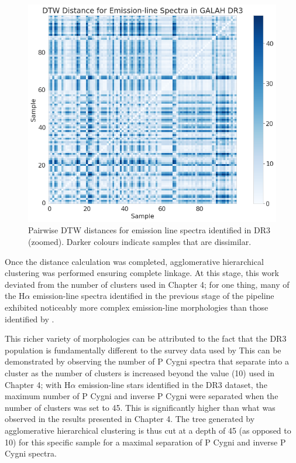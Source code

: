 \begin{figure}[!htb]
\centering
\includegraphics[scale=0.50]{figures/dtw distances dr3 zoomed.png}
\caption{Pairwise DTW distances for emission line spectra identified in DR3 (zoomed). Darker colours indicate samples that are dissimilar.}
\end{figure}

Once the distance calculation was completed, agglomerative hierarchical clustering was performed ensuring complete linkage. At this stage, this work deviated from the number of clusters used in Chapter 4; for one thing, many of the H$\alpha$ emission-line spectra identified in the previous stage of the pipeline exhibited noticeably more complex emission-line morphologies than those identified by \citet{vcotar2021galah}. 

This richer variety of morphologies can be attributed to the fact that the DR3 population is fundamentally different to the survey data used by \citet{vcotar2021galah} This can be demonstrated by observing the number of P Cygni spectra that separate into a cluster as the number of clusters is increased beyond the value (10) used in Chapter 4; with H$\alpha$ emission-line stars identified in the DR3 dataset, the maximum number of P Cygni and inverse P Cygni were separated when the number of clusters was set to 45. This is significantly higher than what was observed in the results presented in Chapter 4. The tree generated by agglomerative hierarchical clustering is thus cut at a depth of 45 (as opposed to 10) for this specific sample for a maximal separation of P Cygni and inverse P Cygni spectra. 

